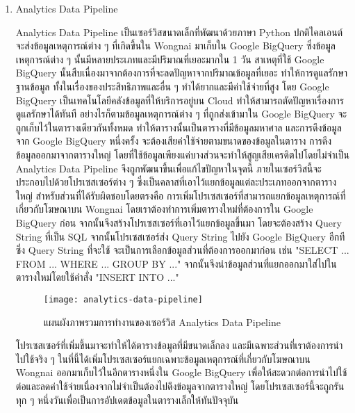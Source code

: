 \begin{enumerate}
	\item Analytics Data Pipeline
	
	Analytics Data Pipeline เป็นเซอร์วิสขนาดเล็กที่พัฒนาด้วยภาษา Python ปกติไคลเอนต์จะส่งข้อมูลเหตุการณ์ต่าง ๆ ที่เกิดขึ้นใน Wongnai มาเก็บใน Google BigQuery ซึ่งข้อมูลเหตุการณ์ต่าง ๆ นั้นมีหลายประเภทและมีปริมาณที่เยอะมากใน 1 วัน สาเหตุที่ใช้ Google BigQuery นั้นสืบเนื่องมาจากต้องการที่จะลดปัญหาจากปริมาณข้อมูลที่เยอะ ทำให้การดูแลรักษาฐานข้อมูล ทั้งในเรื่องของประสิทธิภาพและอื่น ๆ ทำได้ยากและมีค่าใช้จ่ายที่สูง โดย Google BigQuery เป็นเทคโนโลยีคลังข้อมูลที่ให้บริการอยู่บน Cloud ทำให้สามารถตัดปัญหาเรื่องการดูแลรักษาได้ทันที อย่างไรก็ตามข้อมูลเหตุการณ์ต่าง ๆ ที่ถูกส่งเข้ามาใน Google BigQuery จะถูกเก็บไว้ในตารางเดียวกันทั้งหมด ทำให้ตารางนั้นเป็นตารางที่มีข้อมูลมหาศาล และการดึงข้อมูลจาก Google BigQuery หนึ่งครั้ง จะต้องเสียค่าใช้จ่ายตามขนาดของข้อมูลในตาราง การดึงข้อมูลออกมาจากตารางใหญ่ โดยที่ใช้ข้อมูลเพียงแค่บางส่วนจะทำให้สูญเสียเครดิตไปโดยไม่จำเป็น Analytics Data Pipeline จึงถูกพัฒนาขึ้นเพื่อแก้ไขปัญหาในจุดนี้ ภายในเซอร์วิสนี้จะประกอบไปด้วยโปรเซสเซอร์ต่าง ๆ ซึ่งเป็นคลาสที่เอาไว้แยกข้อมูลแต่ละประเภทออกจากตารางใหญ่ สำหรับส่วนที่ได้รับผิดชอบโดยตรงคือ การเพิ่มโปรเซสเซอร์ที่สามารถแยกข้อมูลเหตุการณ์ที่เกี่ยวกับโฆษณาบน Wongnai โดยเราต้องทำการเพิ่มตารางใหม่ที่ต้องการใน Google BigQuery ก่อน จากนั้นจึงสร้างโปรเซสเซอร์ที่เอาไว้แยกข้อมูลขึ้นมา โดยจะต้องสร้าง Query String ที่เป็น SQL จากนั้นโปรเซสเซอร์ส่ง Query String ไปยัง Google BigQuery อีกที ซึ่ง Query String ที่จะใช้ จะเป็นการเลือกข้อมูลส่วนที่ต้องการออกมาก่อน เช่น "SELECT ... FROM ... WHERE ... GROUP BY ..." จากนั้นจึงนำข้อมูลส่วนที่แยกออกมาใส่ไปในตารางใหม่โดยใช้คำสั่ง "INSERT INTO ..."
	
	\begin{figure}[!h]
		\centering
		\texttt{[image: analytics-data-pipeline]}  
		\caption{แผนผังภาพรวมการทำงานของเซอร์วิส Analytics Data Pipeline}
		\label{Fig:analytics-data-pipeline}
	\end{figure}
	
	โปรเซสเซอร์ที่เพิ่มขึ้นมาจะทำให้ได้ตารางข้อมูลที่มีขนาดเล็กลง และมีเฉพาะส่วนที่เราต้องการนำไปใช้จริง ๆ ในที่นี้ได้เพิ่มโปรเซสเซอร์แยกเฉพาะข้อมูลเหตุการณ์ที่เกี่ยวกับโฆษณาบน Wongnai ออกมาเก็บไว้ในอีกตารางหนึ่งใน Google BigQuery เพื่อให้สะดวกต่อการนำไปใช้ต่อและลดค่าใช้จ่ายเนื่องจากไม่จำเป็นต้องไปดึงข้อมูลจากตารางใหญ่ โดยโปรเซสเซอร์นี้จะถูกรันทุก ๆ หนึ่งวันเพื่อเป็นการอัปเดตข้อมูลในตารางเล็กให้ทันปัจจุบัน
	

\end{enumerate}
